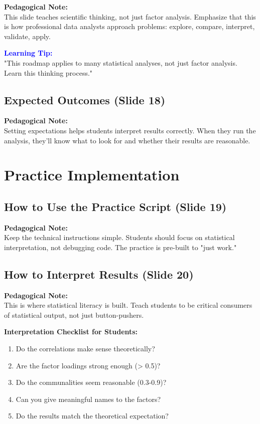 \documentclass[11pt,a4paper]{article}
\newenvironment{pedagogicalnote}{%
  \begin{framed}
  \noindent\textbf{Pedagogical Note:}\\
}{\end{framed}}
\newenvironment{learningtip}{%
  \begin{framed}
  \noindent\textcolor{blue}{\textbf{Learning Tip:}}\\
}{\end{framed}}
\begin{document}
\begin{pedagogicalnote}
This slide teaches scientific thinking, not just factor analysis. Emphasize that this is how professional data analysts approach problems: explore, compare, interpret, validate, apply.
\end{pedagogicalnote}

\begin{learningtip}
"This roadmap applies to many statistical analyses, not just factor analysis. Learn this thinking process."
\end{learningtip}

\subsection{Expected Outcomes (Slide 18)}

\begin{pedagogicalnote}
Setting expectations helps students interpret results correctly. When they run the analysis, they'll know what to look for and whether their results are reasonable.
\end{pedagogicalnote}

\section{Practice Implementation}

\subsection{How to Use the Practice Script (Slide 19)}

\begin{pedagogicalnote}
Keep the technical instructions simple. Students should focus on statistical interpretation, not debugging code. The practice is pre-built to "just work."
\end{pedagogicalnote}

\subsection{How to Interpret Results (Slide 20)}

\begin{pedagogicalnote}
This is where statistical literacy is built. Teach students to be critical consumers of statistical output, not just button-pushers.
\end{pedagogicalnote}

\textbf{Interpretation Checklist for Students:}
\begin{enumerate}
    \item Do the correlations make sense theoretically?
    \item Are the factor loadings strong enough (> 0.5)?
    \item Do the communalities seem reasonable (0.3-0.9)?
    \item Can you give meaningful names to the factors?
    \item Do the results match the theoretical expectation?
\end{enumerate}
\end{document}
